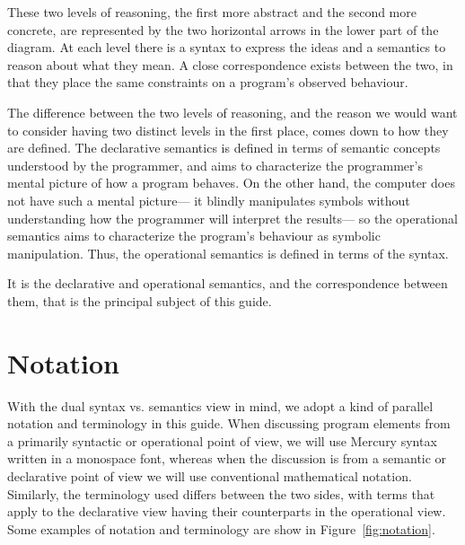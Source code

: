These two levels of reasoning,
the first more abstract and the second more concrete,
are represented by
the two horizontal arrows in the lower part of the diagram.
At each level there is a syntax to express the ideas
and a semantics to reason about what they mean.
A close correspondence exists between the two,
in that they place the same constraints
on a program's observed behaviour.

The difference between the two levels of reasoning,
and the reason we would want to consider
having two distinct levels in the first place,
comes down to how they are defined.
The declarative semantics is defined in terms of semantic concepts
understood by the programmer,
and aims to characterize the programmer's mental picture
of how a program behaves.
On the other hand,
the computer does not have such a mental picture---%
it blindly manipulates symbols
without understanding how the programmer will interpret the results---%
so the operational semantics aims to characterize
the program's behaviour as symbolic manipulation.
Thus, the operational semantics is defined
in terms of the syntax.

It is the declarative and operational semantics,
and the correspondence between them,
that is the principal subject of this guide.


\section{Notation}
\label{sec:notation}

With the dual syntax vs. semantics view in mind,
we adopt a kind of parallel notation and terminology in this guide.
When discussing program elements
from a primarily syntactic or operational point of view,
we will use Mercury syntax written in a monospace font,
whereas when the discussion is from a semantic or declarative point of view
we will use conventional mathematical notation.
Similarly,
the terminology used differs between the two sides,
with terms that apply to the declarative view
having their counterparts in the operational view.
Some examples of notation and terminology
are show in Figure~\ref{fig:notation}.

